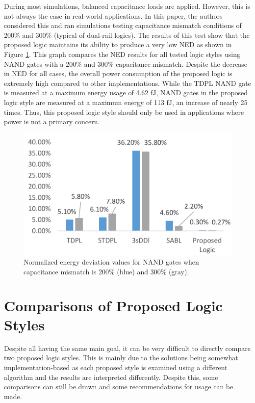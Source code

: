 \documentclass[conference, 12pt]{IEEEtran}
\newcommand{\x}{1}						%
\begin{document}
			During most simulations, balanced capacitance loads are applied. However, this is not always the case in real-world applications. In this paper, the authors considered this and ran simulations testing capacitance mismatch conditions of 200\% and 300\% (typical of dual-rail logics). The results of this test show that the proposed logic maintains its ability to produce a very low NED as shown in Figure \ref{Nano_Mismatched_Capacitance}. This graph compares the NED results for all tested logic styles using NAND gates with a 200\% and 300\% capacitance mismatch. Despite the decrease in NED for all cases, the overall power consumption of the proposed logic is extremely high compared to other implementations. While the TDPL NAND gate is measured at a maximum energy usage of 4.62 fJ, NAND gates in the proposed logic style are measured at a maximum energy of 113 fJ, an increase of nearly 25 times. Thus, this proposed logic style should only be used in applications where power is not a primary concern.

			\begin{figure}[tbp]
				\centering
				\includegraphics[width=\x\linewidth]{ReportFiles/Nano_Mismatched_Capacitance.png}
				\caption{Normalized energy deviation values for NAND gates when capacitance mismatch is 200\% (blue) and 300\% (gray).\cite{b6}}
				\label{Nano_Mismatched_Capacitance}
			\end{figure}

	\section{Comparisons of Proposed Logic Styles}
		Despite all having the same main goal, it can be very difficult to directly compare two proposed logic styles. This is mainly due to the solutions being somewhat implementation-based as each proposed style is examined using a different algorithm and the results are interpreted differently. Despite this, some comparisons can still be drawn and some recommendations for usage can be made.
\end{document}
